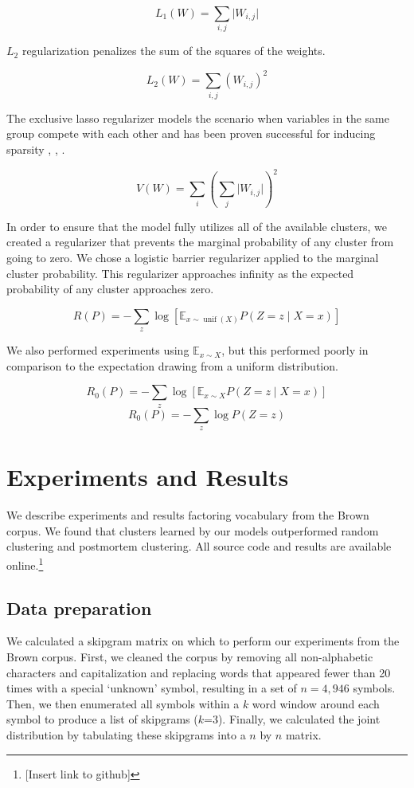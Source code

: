 \documentclass[11pt,letterpaper]{article}
\begin{document}
$$L_1(W) = \sum_{i,j} \lvert W_{i,j} \rvert $$

$L_2$ regularization penalizes the sum of the squares of the weights.

$$L_2(W) = \sum_{i,j} (W_{i,j})^2 $$

The exclusive lasso regularizer models the scenario when variables in the same group compete with each other and has been proven successful for inducing sparsity
\cite{zhou10a}, 
\cite{bach2012},
 \cite{Campbell15}.

$$V(W) = \sum_i (\sum_j \lvert W_{i,j} \rvert)^2$$ 

In order to ensure that the model fully utilizes all of the available clusters, we created a regularizer that prevents the marginal probability of any cluster from going to zero. We chose a logistic barrier regularizer applied to the marginal cluster probability. This regularizer approaches infinity as the expected probability of any cluster approaches zero.

$$ R(P) = -\sum_z \log[ \mathbb{E}_{x \sim \operatorname{unif}(X)} P(Z=z \mid X=x)]$$ 

We also performed experiments using $\mathbb{E}_{x \sim X}$, but this performed poorly in comparison to the expectation drawing from a uniform distribution.

$$R_0(P) =  -\sum_z \log [ \mathbb{E}_{x \sim X} P(Z=z \mid X=x) ]$$ 
$$R_0(P) =  -\sum_z \log P(Z=z )$$ 

\section{Experiments and Results}

We describe experiments and results factoring vocabulary from the Brown corpus. We found that clusters learned by our models outperformed random clustering and postmortem clustering. All source code and results are available online.\footnote{[Insert link to github]}

\subsection{Data preparation}

We calculated a skipgram matrix on which to perform our experiments from the Brown corpus. First, we cleaned the corpus by removing all non-alphabetic characters and capitalization and replacing words that appeared fewer than 20 times with a special `unknown' symbol, resulting in a set of $n=4,946$ symbols. Then, we then enumerated all symbols within a $k$ word window around each symbol to produce a list of skipgrams ($k$=3). Finally, we calculated the joint distribution by tabulating these skipgrams into a $n$ by $n$ matrix.
\end{document}
